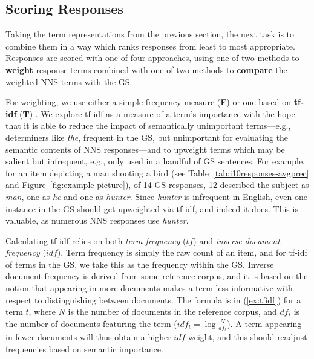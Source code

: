 \documentclass[11pt,letterpaper]{article}
\newcommand{\md}[1]{\marginpar{\scriptsize MD: #1}}
\newcommand{\lk}[1]{\marginpar{\scriptsize LK: #1}}
\renewcommand{\marginpar}[1]{}
\begin{document}
\subsection{Scoring Responses}
\label{sec:scoring}

Taking the term representations from the previous section, the next
task is to combine them in a way which ranks responses from least to
most appropriate.  Responses are scored with one of four approaches,
using one of two methods to \textbf{weight} response terms combined
with one of two methods to \textbf{compare} the weighted NNS terms
with the GS.


For weighting, we use either a simple frequency measure (\textbf{F})
or one based on \textbf{tf-idf} (\textbf{T})
\citep[][ch. 6]{manning-et-al:08}.  We explore tf-idf as a measure of
a term's importance with the hope that it is able to reduce the impact
of semantically unimportant terms---e.g., determiners like
\textit{the}, frequent in the GS, but unimportant for evaluating the
semantic contents of NNS responses---and to upweight terms which may
be salient but infrequent, e.g., only used in a handful of GS
sentences. For example, for an item depicting a man shooting a bird
(see Table~\ref{tab:i10responses-avgprec} and Figure~\ref{fig:example-picture}), of 14 GS responses, 12
described the subject as \textit{man}, one as \textit{he} and one as
\textit{hunter}. Since \textit{hunter} is infrequent in English, even
one instance in the GS should get upweighted via tf-idf, and indeed it
does.
This is valuable, as numerous NNS responses use \textit{hunter}.

Calculating tf-idf relies on both \emph{term frequency} ($tf$) and
\emph{inverse document frequency} ($idf$).  Term frequency is simply
the raw count of an item, and for tf-idf of terms in the GS, we take
this as the frequency within the GS.  Inverse document frequency is
derived from some reference corpus, and it is based on the notion that
appearing in more documents makes a term less informative with respect
to distinguishing between documents.  The formula is in
(\ref{ex:tfidf}) for a term $t$, where $N$ is the number of documents
in the reference corpus, and $df_{t}$ is the number of documents
featuring the term ($idf_{t} = \log \frac{N}{df_{t}}$).  A term
appearing in fewer documents will thus obtain a higher $idf$ weight,
and this should readjust frequencies based on semantic importance.
\end{document}
